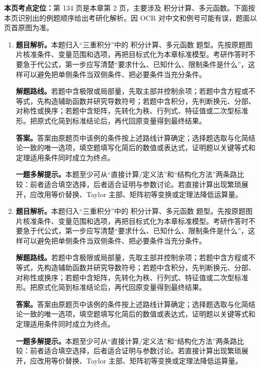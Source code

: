 \begin{solutionblock}
\textbf{本页考点定位：}第 134 页是本章第 2 页，主要涉及 积分计算、多元函数。下面按本页识别出的例题顺序给出考研化解析。因 OCR 对中文和例号可能有误，题面以页首原图为准。

\begin{enumerate}[label=\textbf{例\arabic*.}, leftmargin=2.4em]

\item \textbf{题目解析。}本题归入“三重积分”中的 积分计算、多元函数 题型。先按原题图片核准条件、变量范围和选项，再把目标式化为本章标准模型。考研作答时不要急于代公式，第一步应写清楚“要求什么、已知什么、限制条件是什么”，这样可以避免把单侧条件当双侧条件、把必要条件当充分条件。

\textbf{解题路线。}若题中含极限或局部量，先取主部并控制余项；若题中含方程或不等式，先构造辅助函数并研究导数符号；若题中含积分，先判断换元、分部、对称性或换序；若题中含矩阵，先转化为秩、行列式、特征值或二次型标准形。把原式化简到标准结论后，再代回原变量得到最终结果。

\textbf{答案。}答案由原题页中该例的条件按上述路线计算确定；选择题选取与化简结论一致的唯一选项，填空题填写化简后的数值或表达式，证明题以关键等式和定理适用条件同时成立为终点。

\textbf{一题多解提示。}本题至少可从“直接计算/定义法”和“结构化方法”两条路比较：前者适合填空选择，后者适合证明与参数讨论。若直接计算出现繁琐展开，应改用等价替换、Taylor 主部、矩阵初等变换或定理法降低运算量。

\item \textbf{题目解析。}本题归入“三重积分”中的 积分计算、多元函数 题型。先按原题图片核准条件、变量范围和选项，再把目标式化为本章标准模型。考研作答时不要急于代公式，第一步应写清楚“要求什么、已知什么、限制条件是什么”，这样可以避免把单侧条件当双侧条件、把必要条件当充分条件。

\textbf{解题路线。}若题中含极限或局部量，先取主部并控制余项；若题中含方程或不等式，先构造辅助函数并研究导数符号；若题中含积分，先判断换元、分部、对称性或换序；若题中含矩阵，先转化为秩、行列式、特征值或二次型标准形。把原式化简到标准结论后，再代回原变量得到最终结果。

\textbf{答案。}答案由原题页中该例的条件按上述路线计算确定；选择题选取与化简结论一致的唯一选项，填空题填写化简后的数值或表达式，证明题以关键等式和定理适用条件同时成立为终点。

\textbf{一题多解提示。}本题至少可从“直接计算/定义法”和“结构化方法”两条路比较：前者适合填空选择，后者适合证明与参数讨论。若直接计算出现繁琐展开，应改用等价替换、Taylor 主部、矩阵初等变换或定理法降低运算量。

\end{enumerate}
\end{solutionblock}


